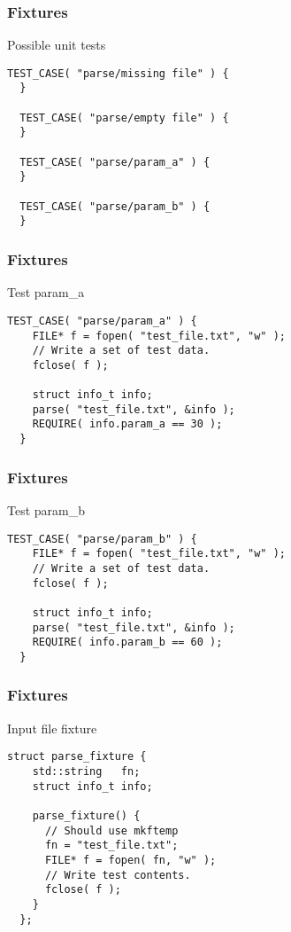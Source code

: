 \begin{frame}[fragile]
  \frametitle{Fixtures}
  \begin{block}{Possible unit tests}
    \begin{lstlisting}[style=C]
  TEST_CASE( "parse/missing file" ) {
  }

  TEST_CASE( "parse/empty file" ) {
  }

  TEST_CASE( "parse/param_a" ) {
  }

  TEST_CASE( "parse/param_b" ) {
  }
    \end{lstlisting}
  \end{block}
\end{frame}

\begin{frame}[fragile]
  \frametitle{Fixtures}
  \begin{block}{Test param\_a}
    \begin{lstlisting}[style=C]
  TEST_CASE( "parse/param_a" ) {
    FILE* f = fopen( "test_file.txt", "w" );
    // Write a set of test data.
    fclose( f );

    struct info_t info;
    parse( "test_file.txt", &info );
    REQUIRE( info.param_a == 30 );
  }
    \end{lstlisting}
  \end{block}
\end{frame}

\begin{frame}[fragile]
  \frametitle{Fixtures}
  \begin{block}{Test param\_b}
    \begin{lstlisting}[style=C]
  TEST_CASE( "parse/param_b" ) {
    FILE* f = fopen( "test_file.txt", "w" );
    // Write a set of test data.
    fclose( f );

    struct info_t info;
    parse( "test_file.txt", &info );
    REQUIRE( info.param_b == 60 );
  }
    \end{lstlisting}
  \end{block}
\end{frame}

\begin{frame}[fragile]
  \frametitle{Fixtures}
  \begin{block}{Input file fixture}
    \begin{lstlisting}[style=C]
  struct parse_fixture {
    std::string   fn;
    struct info_t info;

    parse_fixture() {
      // Should use mkftemp
      fn = "test_file.txt";
      FILE* f = fopen( fn, "w" );
      // Write test contents.
      fclose( f );
    }
  };
    \end{lstlisting}
  \end{block}
\end{frame}

